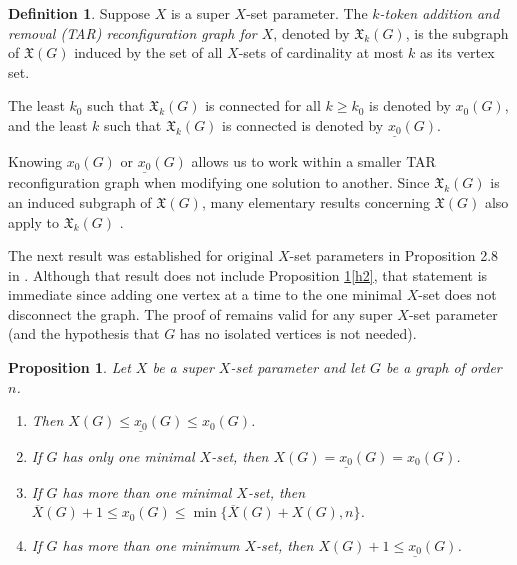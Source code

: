 \documentclass{article}
\numberwithin{figure}{section}
\numberwithin{table}{section}
\numberwithin{equation}{section}
\newtheorem{prop}[thm]{Proposition}
\theoremstyle{definition}
\newtheorem{rem}[thm]{Remark}
\theoremstyle{definition}
\newtheorem{defn}[thm]{Definition}
\theoremstyle{definition}
\newcommand{\ben}{\begin{enumerate}}
\newcommand{\een}{\end{enumerate}}
\newcommand{\ol}{\overline}
\newcommand{\xbar}{\ol X}
\newcommand{\xtar}{\mathfrak{X}}%
\newcommand{\xxo}{x_0}
\newcommand{\ulxo}{\underline{x_0}}
\begin{document}
{ 

\begin{defn}  \label{def: k token X}
Suppose $X$ is a  super $X$-set parameter.      The \emph{$k$-token addition and removal (TAR) reconfiguration graph for $X$}, denoted by $\xtar_k(G)$, is the subgraph of $\xtar(G)$ induced by the set of all  $X$-sets of cardinality at most $k$ as its vertex set. 


The least $k_0$ such that $\xtar_k(G)$ is connected for all $k\ge k_0$ is denoted by $\xxo(G)$, and the least $k$ such that $\xtar_k(G)$ is connected is denoted by $\ulxo(G)$.
\end{defn}

 Knowing $\xxo(G)$ or $\ulxo(G)$ allows us to work within a smaller TAR reconfiguration graph when modifying one solution to another.
Since  $\xtar_k(G)$ is an induced subgraph of $\xtar(G)$,  many elementary results concerning $\xtar(G)$ also apply to $\xtar_k(G)$ . 



 The next result was established for  original $X$-set parameters in  Proposition 2.8 in \cite{PDrecon}.  Although that result does not include Proposition \ref{basic1}\eqref{h2}, that statement is immediate since adding one vertex at a time to the one minimal $X$-set does not disconnect the graph.  The proof of \cite[Proposition 2.8]{PDrecon} remains valid for any super $X$-set parameter (and the hypothesis that $G$ has no isolated vertices is not needed). 


\begin{prop}\label{basic1}
    Let  $X$ be a  super $X$-set parameter and let $G$ be a graph of order $n$.
    \ben[$(1)$]
    \item\label{h1} Then $X(G)\le \ulxo(G)\le\xxo(G)$.
    \item\label{h2} If $G$ has only one minimal $X$-set, then $X(G)=\ulxo(G)=\xxo(G)$.
    \item\label{h3} If $G$ has more than one minimal $X$-set, then 
    $\xbar(G)+1\le \xxo(G)\le\min\{\xbar(G)+X(G),n\}$.
    \item\label{h4} If $G$ has more than one minimum $X$-set, then 
    $X(G)+1\le \ulxo(G)$.
    \een
\end{prop}

}
\end{document}

